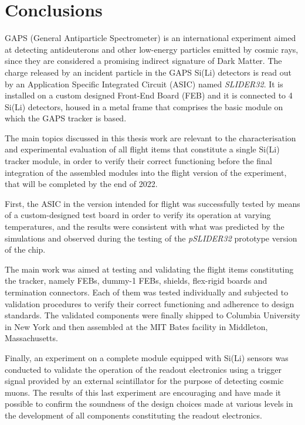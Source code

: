 \chapter*{Conclusions}

\par
GAPS (General Antiparticle Spectrometer) is an international experiment aimed at detecting antideuterons and other low-energy particles emitted by cosmic rays, since they are considered a promising indirect signature of Dark Matter. The charge released by an incident particle in the GAPS Si(Li) detectors is read out by an Application Specific Integrated Circuit (ASIC) named \textit{SLIDER32}. It is installed on a custom designed Front-End Board (FEB) and it is connected to 4 Si(Li) detectors, housed in a metal frame that comprises the basic module on which the GAPS tracker is based.

\par
The main topics discussed in this thesis work are relevant to the characterisation and experimental evaluation of all flight items that constitute a single Si(Li) tracker module, in order to verify their correct functioning before the final integration of the assembled modules into the flight version of the experiment, that will be completed by the end of 2022.

\par
First, the ASIC in the version intended for flight was successfully tested by means of a custom-designed test board in order to verify its operation at varying temperatures, and the results were consistent with what was predicted by the simulations and observed during the testing of the \textit{pSLIDER32} prototype version of the chip.

\par
The main work was aimed at testing and validating the flight items constituting the tracker, namely FEBs, dummy-1 FEBs, shields, flex-rigid boards and termination connectors. Each of them was tested individually and subjected to validation procedures to verify their correct functioning and adherence to design standards. The validated components were finally shipped to Columbia University in New York and then assembled at the MIT Bates facility in Middleton, Massachusetts.

\par
Finally, an experiment on a complete module equipped with Si(Li) sensors was conducted to validate the operation of the readout electronics using a trigger signal provided by an external scintillator for the purpose of detecting cosmic muons. The results of this last experiment are encouraging and have made it possible to confirm the soundness of the design choices made at various levels in the development of all components constituting the readout electronics.

